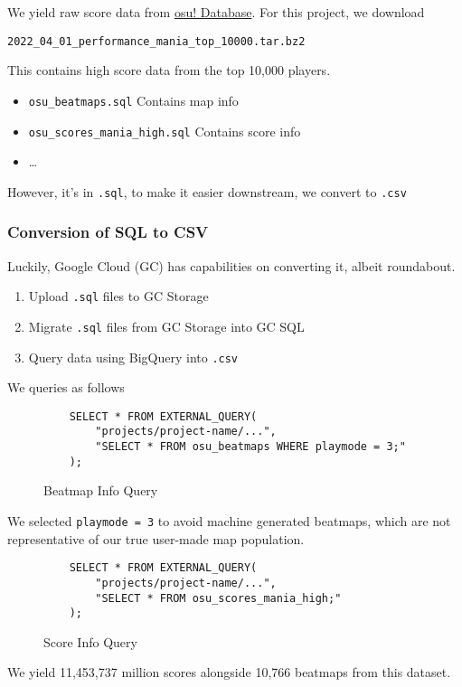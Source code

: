 We yield raw score data from \href{https://data.ppy.sh/}{osu! Database}.
For this project, we download

\verb+2022_04_01_performance_mania_top_10000.tar.bz2+

This contains high score data from the top 10,000 players.

\begin{itemize}
    \item \verb+osu_beatmaps.sql+ Contains map info
    \item \verb+osu_scores_mania_high.sql+ Contains score info
    \item \ldots
\end{itemize}

However, it's in \verb+.sql+, to make it easier downstream, we convert to \verb+.csv+

\subsubsection*{Conversion of SQL to CSV}

Luckily, Google Cloud (GC) has capabilities on converting it, albeit roundabout.

\begin{enumerate}
    \item Upload \verb+.sql+ files to GC Storage
    \item Migrate \verb+.sql+ files from GC Storage into GC SQL
    \item Query data using BigQuery into \verb+.csv+
\end{enumerate}

We queries as follows

\begin{figure}[H]
    \centering
    \begin{verbatim}
    SELECT * FROM EXTERNAL_QUERY(
        "projects/project-name/...",
        "SELECT * FROM osu_beatmaps WHERE playmode = 3;"
    );
    \end{verbatim}
    \caption{Beatmap Info Query}
    \label{fig:map_query}
\end{figure}

We selected \verb+playmode = 3+ to avoid machine generated beatmaps, which are not representative
of our true user-made map population.

\begin{figure}[H]
    \centering
    \begin{verbatim}
    SELECT * FROM EXTERNAL_QUERY(
        "projects/project-name/...",
        "SELECT * FROM osu_scores_mania_high;"
    );
    \end{verbatim}
    \caption{Score Info Query}
    \label{fig:score_query}
\end{figure}

We yield 11,453,737 million scores alongside 10,766 beatmaps from this dataset.



